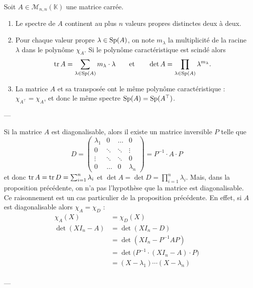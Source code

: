 \begin{prop}
	Soit $A \in \mathscr{M}_{n,n}(\mathds{K})$\/ une matrice carrée.
	\begin{enumerate}
		\item Le spectre de $A$\/ continent au plus $n$\/ valeurs propres distinctes deux à deux.
		\item Pour chaque valeur propre $\lambda \in  \operatorname{Sp}(A)$, on note $m_\lambda$\/ la multiplicité de la racine $\lambda$\/ dans le polynôme $\chi_A$. Si le polynôme caractéristique est scindé alors \[
				\operatorname{tr} A = \sum_{\lambda \in \operatorname{Sp}(A)} m_\lambda \cdot \lambda \qquad \text{et}\qquad \operatorname{det} A = \prod_{\lambda \in \operatorname{Sp}(A)} \lambda^{m_\lambda}
			.\]
		\item La matrice $A$\/ et sa transposée ont le même polynôme caractéristique : $\chi_{A^\top} = \chi_A$, et donc le même spectre $\operatorname{Sp}(A) = \operatorname{Sp}(A^\top)$.
	\end{enumerate}
\end{prop}

\noindent---

Si la matrice $A$\/ est diagonalisable, alors il existe un matrice inversible $P$\/ telle que \[
	D = \begin{pmatrix}
		\lambda_1 & 0 & \ldots & 0\\
		0&\ddots&\ddots&\vdots\\
		\vdots&\ddots&\ddots&0\\
		0&\ldots&0&\lambda_n
	\end{pmatrix} = P^{-1} \cdot A \cdot P
\]
et donc $\operatorname{tr} A = \operatorname{tr} D = \sum_{i=1}^n \lambda_i$\/ et $\det A = \det D = \prod_{i=1}^n \lambda_i$. Mais, dans la proposition précédente, on n'a pas l'hypothèse que la matrice est diagonalisable. Ce raisonnement est un cas particulier de la proposition précédente. En effet, si $A$\/ est diagonalisable alors $\chi_A = \chi_D$ : 
\begin{align*}
	\chi_A(X) &= \chi_D(X) \\
	\det(XI_n - A) &= \det(XI_n - D) \\
	&= \det(XI_n - P^{-1}AP) \\
	&= \det\Big(P^{-1}\cdot (XI_n - A)\cdot P\Big) \\
	&= (X-\lambda_1)\cdots(X-\lambda_n) \\
\end{align*}

\noindent---

